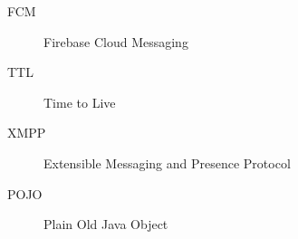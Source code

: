 \begin{description}
        \item[FCM] Firebase Cloud Messaging
        \item[TTL] Time to Live
        \item[XMPP] Extensible Messaging and Presence Protocol
        \item[POJO] Plain Old Java Object
\end{description}
	